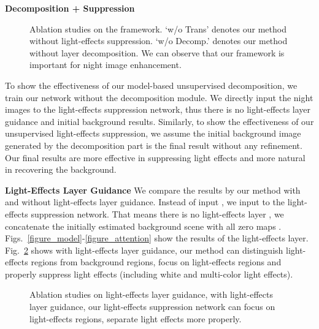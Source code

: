 \documentclass[runningheads]{llncs}
\begin{document}
\noindent \textbf{Decomposition + Suppression}
\begin{figure}[t!]
	\captionsetup[subfloat]{labelformat=empty}
	\captionsetup[subfloat]{farskip=1pt}
	\centering		
	\hfill		
	\hfill
	\hfill
	\hfill
	\caption{Ablation studies on the framework. `w/o Trans' denotes our method without light-effects suppression. `w/o Decomp.' denotes our method without layer decomposition. We can observe that our framework is important for night image enhancement.}
	\label{figure_ablation}
\end{figure}
To show the effectiveness of our model-based unsupervised decomposition, we train our network without the decomposition module.
We directly input the night images to the light-effects suppression network, thus there is no light-effects layer guidance and initial background results.
Similarly, to show the effectiveness of our unsupervised light-effects suppression, we assume the initial background image  generated by the decomposition part is the final result without any refinement. 
Our final results are more effective in suppressing light effects and more natural in recovering the background. 

\noindent \textbf{Light-Effects Layer Guidance}
We compare the results by our method with and without light-effects layer guidance.
Instead of input , we input  to the light-effects suppression network.
That means there is no light-effects layer , we concatenate the initially estimated
background scene with all zero maps .
Figs.~\ref{figure_model}-\ref{figure_attention} show the results of the light-effects layer.
Fig.~\ref{fig_ab_layer} shows with light-effects layer guidance, our method can distinguish light-effects regions from background regions, focus on light-effects regions and properly suppress light effects (including white and multi-color light effects). 

\begin{figure}[t]
	\captionsetup[subfloat]{labelformat=empty}
	\captionsetup[subfloat]{farskip=2pt}	
	\hfill
	\hfill
	\hfill	
	\hfill 
	\caption{Ablation studies on light-effects layer guidance, with light-effects layer  guidance, our light-effects suppression network can focus on light-effects regions, separate light effects more properly.}
	\label{fig_ab_layer}
\end{figure}
\end{document}
